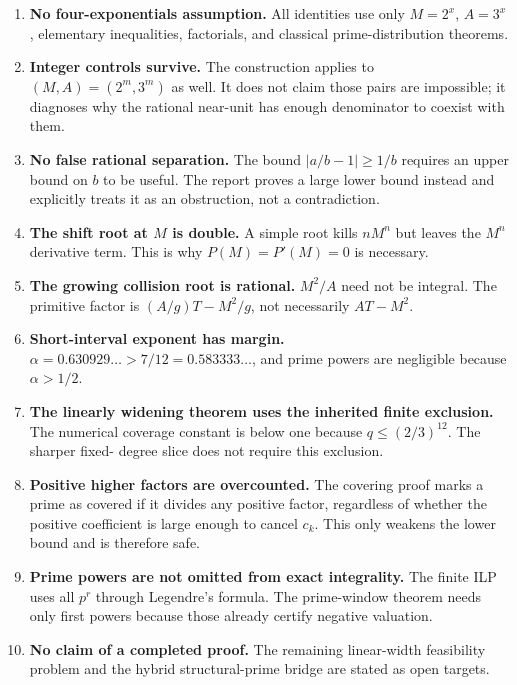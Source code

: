 \documentclass[11pt,oneside]{article}
\theoremstyle{definition}
\theoremstyle{remark}
\begin{document}
\begin{enumerate}
\item \textbf{No four-exponentials assumption.}
All identities use only $M=2^x$, $A=3^x$, elementary inequalities, factorials, and classical
prime-distribution theorems.

\item \textbf{Integer controls survive.}
The construction applies to $(M,A)=(2^m,3^m)$ as well.  It does not claim those pairs are
impossible; it diagnoses why the rational near-unit has enough denominator to coexist with
them.

\item \textbf{No false rational separation.}
The bound $|a/b-1|\ge1/b$ requires an upper bound on $b$ to be useful.  The report proves a
large lower bound instead and explicitly treats it as an obstruction, not a contradiction.

\item \textbf{The shift root at $M$ is double.}
A simple root kills $nM^n$ but leaves the $M^n$ derivative term.  This is why
$P(M)=P'(M)=0$ is necessary.

\item \textbf{The growing collision root is rational.}
$M^2/A$ need not be integral.  The primitive factor is
$(A/g)T-M^2/g$, not necessarily $AT-M^2$.

\item \textbf{Short-interval exponent has margin.}
$\alpha=0.630929\ldots>7/12=0.583333\ldots$, and prime powers are negligible because
$\alpha>1/2$.

\item \textbf{The linearly widening theorem uses the inherited finite exclusion.}
The numerical coverage constant is below one because $q\le(2/3)^{12}$.  The sharper fixed-
degree slice does not require this exclusion.

\item \textbf{Positive higher factors are overcounted.}
The covering proof marks a prime as covered if it divides any positive factor, regardless of
whether the positive coefficient is large enough to cancel $c_k$.  This only weakens the
lower bound and is therefore safe.

\item \textbf{Prime powers are not omitted from exact integrality.}
The finite ILP uses all $p^r$ through Legendre's formula.  The prime-window theorem needs only
first powers because those already certify negative valuation.

\item \textbf{No claim of a completed proof.}
The remaining linear-width feasibility problem and the hybrid structural-prime bridge are
stated as open targets.
\end{enumerate}
\end{document}
